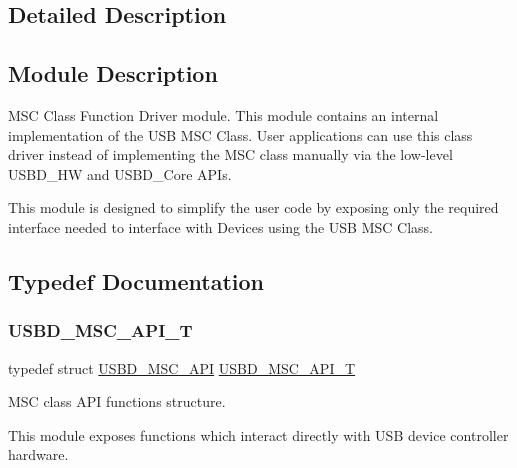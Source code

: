 \subsection{Detailed Description}
\hypertarget{group___u_s_b_d___m_s_c_Sec_MSCModDescription}{}\subsection{Module Description}\label{group___u_s_b_d___m_s_c_Sec_MSCModDescription}
M\+SC Class Function Driver module. This module contains an internal implementation of the U\+SB M\+SC Class. User applications can use this class driver instead of implementing the M\+SC class manually via the low-\/level U\+S\+B\+D\+\_\+\+HW and U\+S\+B\+D\+\_\+\+Core A\+P\+Is.

This module is designed to simplify the user code by exposing only the required interface needed to interface with Devices using the U\+SB M\+SC Class. 

\subsection{Typedef Documentation}
\mbox{\label{group___u_s_b_d___m_s_c_ga521bb0e0edf4060aeb10827c6c29f7cf}} 
\subsubsection{\texorpdfstring{U\+S\+B\+D\+\_\+\+M\+S\+C\+\_\+\+A\+P\+I\+\_\+T}{USBD\_MSC\_API\_T}}
{\footnotesize\ttfamily typedef struct \hyperlink{struct_u_s_b_d___m_s_c___a_p_i}{U\+S\+B\+D\+\_\+\+M\+S\+C\+\_\+\+A\+PI}  \hyperlink{group___u_s_b_d___m_s_c_ga521bb0e0edf4060aeb10827c6c29f7cf}{U\+S\+B\+D\+\_\+\+M\+S\+C\+\_\+\+A\+P\+I\+\_\+T}}



M\+SC class A\+PI functions structure.

This module exposes functions which interact directly with U\+SB device controller hardware. 

\mbox{\label{group___u_s_b_d___m_s_c_ga01cbe726c0ee97ee44661ca88d7e8fbd}} 
